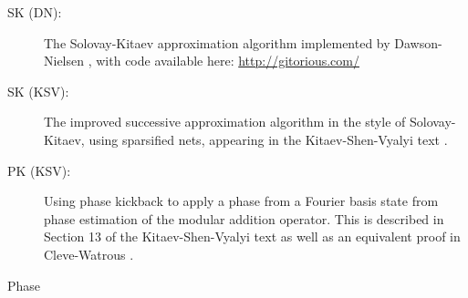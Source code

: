 \begin{description}
\item[SK (DN):] The Solovay-Kitaev approximation algorithm implemented by
Dawson-Nielsen \cite{Dawson2005}, with code available here:
\url{http://gitorious.com/}
\item[SK (KSV):] The improved successive approximation algorithm in the
style of Solovay-Kitaev, using sparsified nets, appearing in
the Kitaev-Shen-Vyalyi text \cite{Kitaev2002}.
\item[PK (KSV):] Using phase kickback to apply a phase from a Fourier
basis state from phase estimation of the modular addition operator. This
is described in Section 13 of the Kitaev-Shen-Vyalyi text
\cite{Kitaev2002} as well as an equivalent
proof in Cleve-Watrous \cite{Cleve2000}.
\item[Phase ]
\end{description}